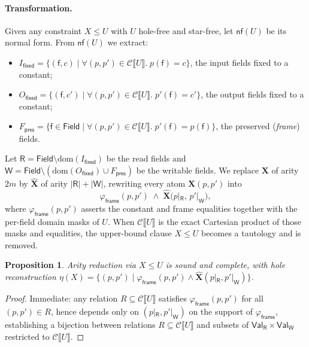\documentclass[11pt,a4paper]{article}
\newtheorem{proposition}[theorem]{Proposition}
\theoremstyle{definition}
\theoremstyle{remark}
\newcommand{\Field}{\mathsf{Field}}
\newcommand{\Val}{\mathsf{Val}}
\newcommand{\Csem}[1]{\mathcal{C}\llbracket #1 \rrbracket}
\begin{document}
\paragraph{Transformation.}
Given any constraint $X \le U$ with $U$ hole-free and star-free, let $\mathsf{nf}(U)$ be its normal
form. From $\mathsf{nf}(U)$ we extract:
\begin{itemize}
  \item $I_{\mathsf{fixed}} = \{(\mathsf{f}, c) \mid \forall (p,p') \in \Csem{U}.\; p(\mathsf{f}) = c\}$,
        the input fields fixed to a constant;
  \item $O_{\mathsf{fixed}} = \{(\mathsf{f}, c') \mid \forall (p,p') \in \Csem{U}.\; p'(\mathsf{f}) = c'\}$,
        the output fields fixed to a constant;
  \item $F_{\mathsf{pres}} = \{\mathsf{f} \in \Field \mid \forall (p,p') \in \Csem{U}.\; p'(\mathsf{f}) = p(\mathsf{f})\}$,
        the preserved (\emph{frame}) fields.
\end{itemize}
Let $\mathsf{R} = \Field \setminus \mathrm{dom}(I_{\mathsf{fixed}})$ be the read fields and
$\mathsf{W} = \Field \setminus (\mathrm{dom}(O_{\mathsf{fixed}}) \cup F_{\mathsf{pres}})$ be the
writable fields. We replace $\mathbf{X}$ of arity $2m$ by $\widehat{\mathbf{X}}$ of arity
$|\mathsf{R}| + |\mathsf{W}|$, rewriting every atom $\mathbf{X}(p, p')$ into
\[
  \varphi_{\mathsf{frame}}(p, p') \;\land\; \widehat{\mathbf{X}}\bigl(p|_{\mathsf{R}},\, p'|_{\mathsf{W}}\bigr),
\]
where $\varphi_{\mathsf{frame}}(p, p')$ asserts the constant and frame equalities together with the
per-field domain masks of $U$. When $\Csem{U}$ is the exact Cartesian product of those masks and
equalities, the upper-bound clause $X \le U$ becomes a tautology and is removed.

\begin{proposition}
Arity reduction via $X \le U$ is sound and complete, with hole reconstruction
$\eta(X) = \{(p, p') \mid \varphi_{\mathsf{frame}}(p, p') \land \widehat{\mathbf{X}}(p|_{\mathsf{R}}, p'|_{\mathsf{W}})\}$.
\end{proposition}

\begin{proof}
Immediate: any relation $R \subseteq \Csem{U}$ satisfies $\varphi_{\mathsf{frame}}(p, p')$ for all
$(p, p') \in R$, hence depends only on $(p|_{\mathsf{R}}, p'|_{\mathsf{W}})$ on the support of
$\varphi_{\mathsf{frame}}$, establishing a bijection between relations $R \subseteq \Csem{U}$ and
subsets of $\Val_{\mathsf{R}} \times \Val_{\mathsf{W}}$ restricted to $\Csem{U}$.
\end{proof}
\end{document}
